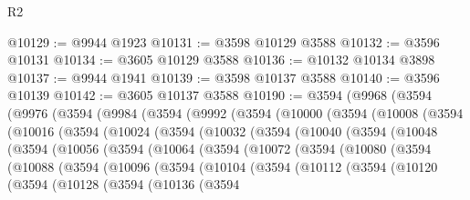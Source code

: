 \begin{lexlean}{R2}
\begin{coremodule}
@10129 := @9944 @1923
@10131 := @3598 @10129 @3588
@10132 := @3596 @10131
@10134 := @3605 @10129 @3588
@10136 := @10132 @10134 @3898
@10137 := @9944 @1941
@10139 := @3598 @10137 @3588
@10140 := @3596 @10139
@10142 := @3605 @10137 @3588
@10190 := @3594
    (@9968
      (@3594
        (@9976
          (@3594
            (@9984
              (@3594
                (@9992
                  (@3594
                    (@10000
                      (@3594
                        (@10008
                          (@3594
                            (@10016
                              (@3594
                                (@10024
                                  (@3594
                                    (@10032
                                      (@3594
                                        (@10040
                                          (@3594
                                            (@10048
                                              (@3594
                                                (@10056
                                                  (@3594
                                                    (@10064
                                                      (@3594
                                                        (@10072
                                                          (@3594
                                                            (@10080
                                                              (@3594
                                                                (@10088
                                                                  (@3594
                                                                    (@10096
                                                                      (@3594
                                                                        (@10104
                                                                          (@3594
                                                                            (@10112
                                                                              (@3594
                                                                                (@10120
                                                                                  (@3594
                                                                                    (@10128
                                                                                      (@3594
                                                                                        (@10136
                                                                                          (@3594

\end{coremodule}
\end{lexlean}
